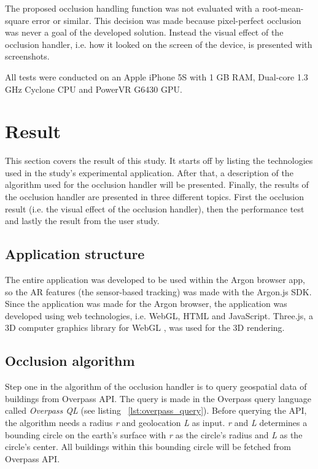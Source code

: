 The proposed occlusion handling function was not evaluated with a root-mean-square error or similar. This decision was made because pixel-perfect occlusion was never a goal of the developed solution. Instead the visual effect of the occlusion handler, i.e. how it looked on the screen of the device, is presented with screenshots.

All tests were conducted on an Apple iPhone 5S with 1 GB RAM, Dual-core 1.3 GHz Cyclone CPU and PowerVR G6430 GPU.

\section{Result}
This section covers the result of this study. It starts off by listing the technologies used in the study's experimental application. After that, a description of the algorithm used for the occlusion handler will be presented. Finally, the results of the occlusion handler are presented in three different topics. First the occlusion result (i.e. the visual effect of the occlusion handler), then the performance test and lastly the result from the user study.

\subsection{Application structure}
The entire application was developed to be used within the Argon browser app, so the AR features (the sensor-based tracking) was made with the Argon.js SDK. Since the application was made for the Argon browser, the application was developed using web technologies, i.e. WebGL, HTML and JavaScript. Three.js, a 3D computer graphics library for WebGL \cite{threeAbout}, was used for the 3D rendering.

\subsection{Occlusion algorithm}
Step one in the algorithm of the occlusion handler is to query geospatial data of buildings from Overpass API. The query is made in the Overpass query language called \textit{Overpass QL} (see listing ~\ref{lst:overpass_query}). Before querying the API, the algorithm needs a radius \textit{r} and geolocation \textit{L} as input. \textit{r} and \textit{L} determines a bounding circle on the earth's surface with \textit{r} as the circle's radius and \textit{L} as the circle's center. All buildings within this bounding circle will be fetched from Overpass API.

